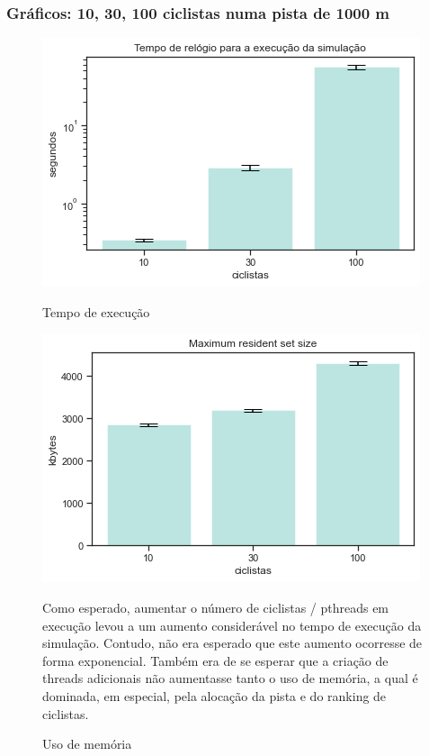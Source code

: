 \documentclass{beamer}
\begin{document}
\begin{frame}
\frametitle{Gráficos: 10, 30, 100 ciclistas numa pista de 1000 m}


\begin{figure}[!htb]
  \includegraphics[width=\linewidth]{imgs/ciclistas_tempo}
  \caption{Tempo de execução}\label{fig:awesome_image1}
\endminipage\hfill
{}
  \includegraphics[width=\linewidth]{imgs/ciclistas_memoria}
  \caption{Uso de memória}\label{fig:awesome_image2}
  \endminipage\hfill

Como esperado, aumentar o número de ciclistas / pthreads em execução levou a um aumento considerável no tempo de
    execução da simulação. Contudo, não era esperado que este aumento ocorresse de forma exponencial. Também era de se
    esperar que a criação de threads adicionais não aumentasse tanto o uso de memória, a qual é dominada, em especial,
    pela alocação da pista e do ranking de ciclistas.

\end{figure}

\end{frame}
\end{document}
